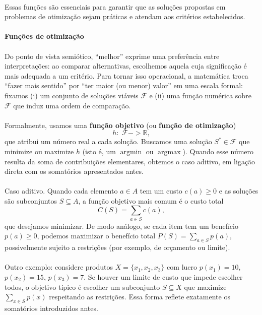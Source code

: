 \documentclass[12pt,a4paper]{article}
\def\emph#1{#1}%
\def\to{->}%
\begin{document}
\paragraph{}Essas funções são essenciais para garantir que as soluções propostas em problemas de otimização sejam práticas e atendam aos critérios estabelecidos.

\paragraph{Funções de otimização}

\paragraph{}
Do ponto de vista semiótico, “melhor” exprime uma preferência entre interpretações: ao comparar alternativas, escolhemos aquela cuja significação é mais adequada a um critério. Para tornar isso operacional, a matemática troca “fazer mais sentido” por “ter maior (ou menor) valor” em uma escala formal: fixamos (i) um conjunto de soluções viáveis \(\mathcal{F}\) e (ii) uma função numérica sobre \(\mathcal{F}\) que induz uma ordem de comparação.

\paragraph{}
Formalmente, usamos uma \textbf{função objetivo} (ou \textbf{função de otimização})
\[h:\; \mathcal{F} \to \mathbb{R},\]
que atribui um número real a cada solução. Buscamos uma solução \(S^*\in\mathcal{F}\) que \emph{minimize} ou \emph{maximize} \(h\) (isto é, um \(\operatorname*{argmin}\) ou \(\operatorname*{argmax}\)). Quando esse número resulta da soma de contribuições elementares, obtemos o caso aditivo, em ligação direta com os somatórios apresentados antes.

\paragraph{}
Caso \emph{aditivo}. Quando cada elemento \(a\in A\) tem um custo \(c(a)\ge 0\) e as soluções são subconjuntos \(S\subseteq A\), a função objetivo mais comum é o custo total
\[C(S)=\sum_{a\in S} c(a),\]
que desejamos \emph{minimizar}. De modo análogo, se cada item tem um benefício \(p(a)\ge 0\), podemos \emph{maximizar} o benefício total \(P(S)=\sum_{a\in S} p(a)\), possivelmente sujeito a restrições (por exemplo, de orçamento ou limite).

\paragraph{}
Outro exemplo: considere produtos \(X=\{x_1,x_2,x_3\}\) com lucro \(p(x_1)=10\), \(p(x_2)=15\), \(p(x_3)=7\). Se houver um limite de custo que impede escolher todos, o objetivo típico é escolher um subconjunto \(S\subseteq X\) que maximize \(\sum_{x\in S} p(x)\) respeitando as restrições. Essa forma reflete exatamente os somatórios introduzidos antes.
\end{document}
